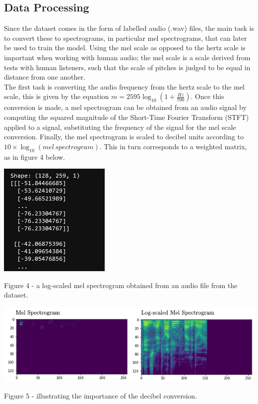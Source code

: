 \documentclass[12pt]{article}
\begin{document}
\subsection{Data Processing}
Since the dataset comes in the form of labelled audio (.wav) files, the main task is to convert these to spectrograms, in particular mel spectrograms, that can later be used to train the model. Using the mel scale as opposed to the hertz scale is important when working with human audio; the mel scale is a scale derived from tests with human listeners, such that the scale of pitches is judged to be equal in distance from one another.
\\

\noindent The first task is converting the audio frequency from the hertz scale to the mel scale, this is given by the equation $m = 2595 \log_{10}\left(1 + \frac{Hz}{700}\right)$. Once this conversion is made, a mel spectrogram can be obtained from an audio signal by computing the squared magnitude of the Short-Time Fourier Transform (STFT) applied to a signal, substituting the frequency of the signal for the mel scale conversion. Finally, the mel spectrogram is scaled to decibel units according to $10 \times \log_{10}(mel \, spectrogram)$. This in turn corresponds to a weighted matrix, as in figure 4 below.
\\
\begin{center}
\includegraphics{figure_3_spectrogram_matrix}
\end{center}
Figure 4 - a log-scaled mel spectrogram obtained from an audio file from the dataset.
\begin{center}
\includegraphics{figure_5_log_spectrogram}
\end{center}
Figure 5 - illustrating the importance of the decibel conversion.
\\
\end{document}
